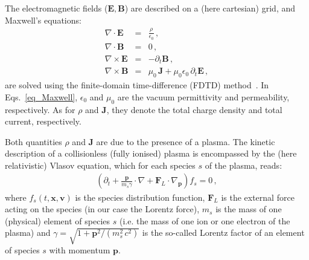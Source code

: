 \documentclass[11pt,a4paper]{article}
\newcommand{\vE}{\mathbf{E}}
\newcommand{\vB}{\mathbf{B}}
\newcommand{\vJ}{\mathbf{J}}
\newcommand{\vx}{\mathbf{x}}
\newcommand{\vp}{\mathbf{p}}
\newcommand{\vv}{\mathbf{v}}
\newcommand{\vF}{\mathbf{F}}
\begin{document}
The electromagnetic fields ($\vE,\vB$) are described on a (here cartesian) grid, and Maxwell's equations:
\begin{subequations}\label{eq_Maxwell}
\begin{eqnarray}
\nabla \cdot \vE &=& \frac{\rho}{\epsilon_0} \,,\\
\nabla \cdot \vB &=& 0 \,,\\
\nabla \times \vE &=& -\partial_t \vB \,,\\
\nabla \times \vB &=& \mu_0\, \vJ + \mu_0 \epsilon_0\,\partial_t \vE \,,
\end{eqnarray}
\end{subequations}
are solved using the finite-domain time-difference (FDTD) method~\cite{taflove_2005}.
In Eqs.~\eqref{eq_Maxwell}, $\epsilon_0$ and $\mu_0$ are the vacuum permittivity and permeability, respectively. 
As for $\rho$ and $\vJ$, they denote the total charge density and total current, respectively.

Both quantities $\rho$ and $\vJ$ are due to the presence of a plasma.
The kinetic description of a collisionless (fully ionised) plasma is encompassed by the (here relativistic) Vlasov equation, which for each species $s$ of the plasma, reads:
\begin{eqnarray}\label{eq_Vlasov}
\left(\partial_t  + \frac{\vp}{m_s \gamma} \cdot \nabla + \vF_L \cdot \nabla_{\vp} \right) f_s = 0\,,
\end{eqnarray}
where $f_s(t,\vx,\vv)$ is the species distribution function, $\vF_L$ is the external force acting on the species (in our case the Lorentz force), $m_s$ is the mass of one (physical) element of species $s$ (i.e. the mass of one ion or one electron of the plasma) and $\gamma = \sqrt{1+\vp^2/(m_s^2\,c^2)}$ is the so-called Lorentz factor of an element of species $s$ with momentum $\vp$.
\end{document}
